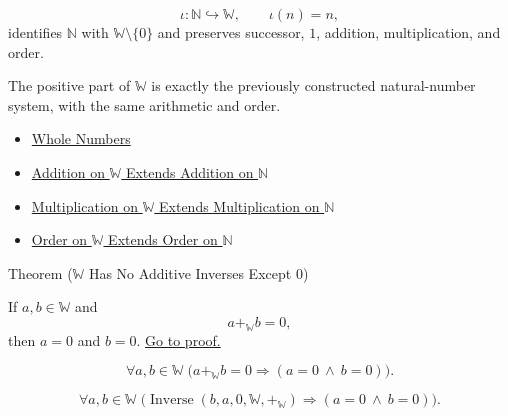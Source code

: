 \begin{remark*}
\[
\iota:\mathbb{N}\hookrightarrow\mathbb{W},\qquad \iota(n)=n,
\]
identifies $\mathbb{N}$ with $\mathbb{W}\setminus\{0\}$ and preserves
successor, $1$, addition, multiplication, and order.
\end{remark*}

\begin{remark*}[Interpretation]
The positive part of $\mathbb{W}$ is exactly the previously constructed
natural-number system, with the same arithmetic and order.
\end{remark*}

\begin{dependencies}
\begin{itemize}
  \item \hyperref[def:whole-numbers]{Whole Numbers}
  \item \hyperref[thm:addition-on-w-extends-addition-on-n]{Addition on $\mathbb{W}$ Extends Addition on $\mathbb{N}$}
  \item \hyperref[thm:multiplication-on-w-extends-multiplication-on-n]{Multiplication on $\mathbb{W}$ Extends Multiplication on $\mathbb{N}$}
  \item \hyperref[thm:order-on-w-extends-order-on-n]{Order on $\mathbb{W}$ Extends Order on $\mathbb{N}$}
\end{itemize}
\end{dependencies}

\begin{theorembox}{Theorem (\texorpdfstring{$\mathbb{W}$}{W} Has No Additive Inverses Except \texorpdfstring{$0$}{0})}
\begin{theorem}
\label{thm:w-has-no-additive-inverses-except-zero}
If $a,b\in\mathbb{W}$ and
\[
a+_{\mathbb{W}}b=0,
\]
then $a=0$ and $b=0$.
\hyperref[prf:w-has-no-additive-inverses-except-zero]{Go to proof.}
\end{theorem}
\end{theorembox}

\begin{remark*}
\[
\forall a,b\in\mathbb{W}\;
\bigl(a+_{\mathbb{W}}b=0 \Longrightarrow (a=0\ \wedge\ b=0)\bigr).
\]
\end{remark*}

\begin{remark*}
\[
\forall a,b\in\mathbb{W}\;
\bigl(
\operatorname{Inverse}(b,a,0,\mathbb{W},+_{\mathbb{W}})
\Longrightarrow (a=0\ \wedge\ b=0)
\bigr).
\]
\end{remark*}


